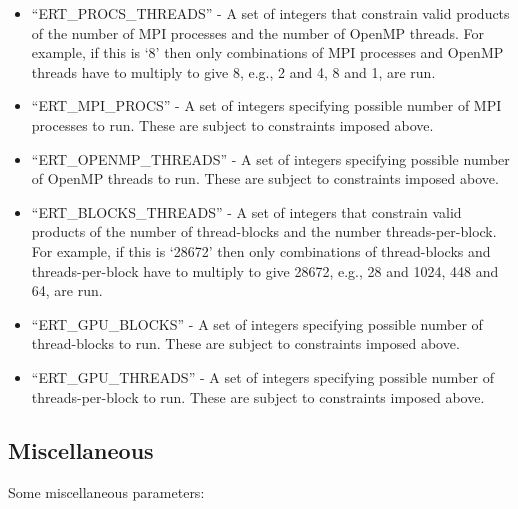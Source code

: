 \begin{itemize}

\vspace{-0.1in}
\item{``ERT\_\+PROCS\_\+THREADS'' - A set of integers that constrain valid
products of the number of MPI processes and the number of OpenMP threads.
For example, if this is `8' then only combinations of MPI processes and
OpenMP threads have to multiply to give 8, e.g., 2 and 4, 8 and 1, are run.}

\vspace{-0.1in}
\item{``ERT\_\+MPI\_\+PROCS'' - A set of integers specifying possible number of
MPI processes to run.  These are subject to constraints imposed above.}

\vspace{-0.1in}
\item{``ERT\_\+OPENMP\_\+THREADS'' - A set of integers specifying possible
number of OpenMP threads to run.  These are subject to constraints imposed
above.}

\vspace{-0.1in}
\item{``ERT\_\+BLOCKS\_\+THREADS'' - A set of integers that constrain valid
products of the number of thread-blocks and the number threads-per-block.
For example, if this is `28672' then only combinations of thread-blocks and
threads-per-block have to multiply to give 28672, e.g., 28 and 1024, 448 and
64, are run.}

\vspace{-0.1in}
\item{``ERT\_\+GPU\_\+BLOCKS'' - A set of integers specifying possible
number of thread-blocks to run.  These are subject to constraints imposed
above.}

\vspace{-0.1in}
\item{``ERT\_\+GPU\_\+THREADS'' - A set of integers specifying possible
number of threads-per-block to run.  These are subject to constraints imposed
above.}

\end{itemize}

\subsection{Miscellaneous}
Some miscellaneous parameters:

